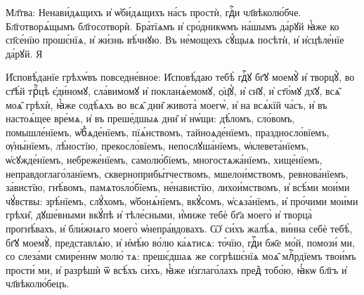 \documentclass[20pt]{extarticle}
\begin{document}
Мл҃тва:
Ненави́дѧщихъ и҆ ѡ҆би́дѧщихъ на́съ простѝ, гдⷭ҇и чл҃вѣколю́бче. Бл҃готворѧ́щымъ бл҃госотворѝ. Бра́тїѧмъ и҆ сро́дникѡмъ на́шымъ да́рꙋй ꙗ҆̀же ко сп҃се́нїю прошє́нїѧ, и҆ жи́знь вѣ́чнꙋю. Въ не́мощехъ сꙋ́щыѧ посѣтѝ, и҆ и҆сцѣле́нїе да́рꙋй. Я%

И҆сповѣ́данїе грѣхѡ́въ повседне́вное:
И҆сповѣ́даю тебѣ̀ гдⷭ҇ꙋ бг҃ꙋ моемꙋ̀ и҆ творцꙋ̀, во ст҃ѣ́й трⷪ҇цѣ є҆ди́номꙋ, сла́вимомꙋ и҆ покланѧ́емомꙋ, ѻ҆ц҃ꙋ̀, и҆ сн҃ꙋ, и҆ ст҃о́мꙋ дх҃ꙋ, всѧ̑ моѧ̑ грѣхѝ, ꙗ҆̀же содѣ́ѧхъ во всѧ̑ дни̑ живота̀ моегѡ̀, и҆ на всѧ́кїй ча́съ, и҆ въ настоѧ́щее вре́мѧ, и҆ въ преше́дшыѧ дни̑ и҆ нѡ́щи: дѣ́ломъ, сло́вомъ, помышле́нїемъ, ѡ҆б꙽ѧде́нїемъ, пїѧ́нствомъ, тайноѧде́нїемъ, праздносло́вїемъ, ѹ҆ны́нїемъ, лѣ́ностїю, прекосло́вїемъ, непослꙋша́нїемъ, ѡ҆клевета́нїемъ, ѡ҆сꙋжде́нїемъ, небреже́нїемъ, самолю́бїемъ, многостѧжа́нїемъ, хище́нїемъ, неправдоглаго́ланїемъ, скверноприбы́тчествомъ, мшелои́мствомъ, ревнова́нїемъ, за́вистїю, гнѣ́вомъ, памѧтоѕло́бїемъ, не́навистїю, лихои́мствомъ, и҆ всѣ́ми мои́ми чꙋ́вствы: зрѣ́нїемъ, слꙋ́хомъ, ѡ҆бонѧ́нїемъ, вкꙋ́сомъ, ѡ҆сѧза́нїемъ, и҆ про́чими мои́ми грѣхи̑, дꙋше́вными вкꙋ́пѣ и҆ тѣле́сными, и҆́миже тебѐ бг҃а моего̀ и҆ творца̀ прогнѣ́вахъ, и҆ бли́жнѧго моего̀ ѡ҆непра́вдовахъ. Ѡ҆ си́хъ жалѣ́ѧ, ви́нна себѐ тебѣ̀, бг҃ꙋ моемꙋ̀, представлѧ́ю, и҆ и҆мѣ́ю во́лю ка́ѧтисѧ: то́чїю, гдⷭ҇и бж҃е мо́й, помози́ ми, со слеза́ми смире́ннѡ молю́ тѧ: прешє́дшаѧ же согрѣшє́нїѧ моѧ̑ млⷭ҇рдїемъ твои́мъ прости́ ми, и҆ разрѣшѝ ѿ всѣ́хъ си́хъ, ꙗ҆̀же и҆зглаго́лахъ пред꙽ тобо́ю, ꙗ҆́кѡ бл҃гъ и҆ чл҃вѣколю́бецъ.
\end{document}
